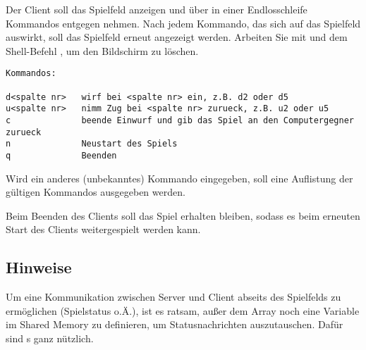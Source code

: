 Der Client soll das Spielfeld anzeigen und über  in einer
Endlosschleife Kommandos entgegen nehmen. Nach jedem Kommando, das sich auf das
Spielfeld auswirkt, soll das Spielfeld erneut angezeigt werden. Arbeiten Sie mit
 und dem Shell-Befehl , um den Bildschirm zu
löschen.

\begin{verbatim}
Kommandos:

d<spalte nr>   wirf bei <spalte nr> ein, z.B. d2 oder d5
u<spalte nr>   nimm Zug bei <spalte nr> zurueck, z.B. u2 oder u5
c              beende Einwurf und gib das Spiel an den Computergegner zurueck
n              Neustart des Spiels
q              Beenden
\end{verbatim}

Wird ein anderes (unbekanntes) Kommando eingegeben, soll eine Auflistung der
gültigen Kommandos ausgegeben werden.

Beim Beenden des Clients soll das Spiel erhalten bleiben, sodass es beim
erneuten Start des Clients weitergespielt werden kann.

\subsection*{Hinweise}

Um eine Kommunikation zwischen Server und Client abseits des Spielfelds zu
ermöglichen (Spielstatus o.Ä.), ist es ratsam, außer dem Array noch eine
Variable im Shared Memory zu definieren, um Statusnachrichten auszutauschen.
Dafür sind s ganz nützlich.

\osueguidelinesthree


